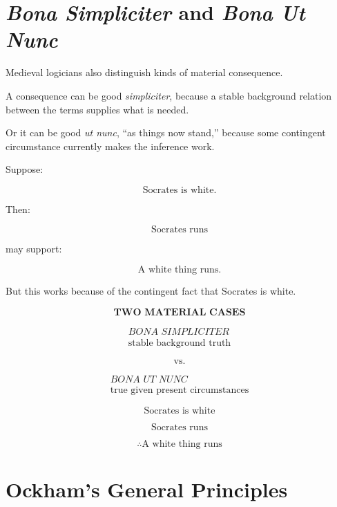 \documentclass[11pt]{article}
\newcommand{\latin}[1]{\textit{#1}}
\begin{document}
\section{\textit{Bona Simpliciter} and \textit{Bona Ut Nunc}}

Medieval logicians also distinguish kinds of material consequence.

A consequence can be good \latin{simpliciter}, because a stable
background relation between the terms supplies what is needed.

Or it can be good \latin{ut nunc}, ``as things now stand,'' because
some contingent circumstance currently makes the inference work.

Suppose:

\[
\text{Socrates is white.}
\]

Then:

\[
\text{Socrates runs}
\]

may support:

\[
\text{A white thing runs.}
\]

But this works because of the contingent fact that Socrates is
white.

\begin{whiteboard}
\[
\textbf{TWO MATERIAL CASES}
\]

\[
\begin{array}{c}
\latin{BONA SIMPLICITER}\\
\text{stable background truth}
\end{array}
\]

\[
\text{vs.}
\]

\[
\begin{array}{c}
\latin{BONA UT NUNC}\\
\text{true given present circumstances}
\end{array}
\]

\[
\text{Socrates is white}
\]

\[
\text{Socrates runs}
\]

\[
\therefore \text{A white thing runs}
\]
\end{whiteboard}

\section{Ockham's General Principles}
\end{document}
